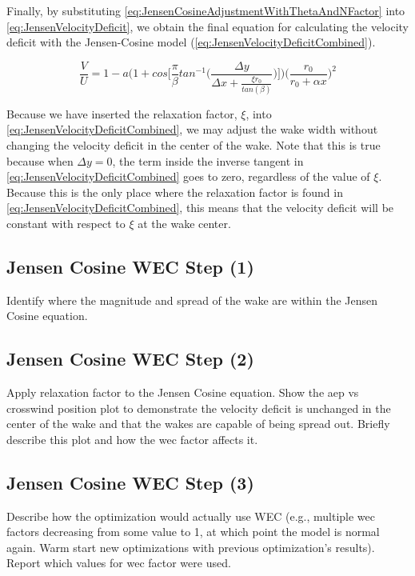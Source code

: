 \documentclass[a4paper]{jpconf}
\begin{document}
Finally, by substituting \cref{eq:JensenCosineAdjustmentWithThetaAndNFactor} into \cref{eq:JensenVelocityDeficit}, we obtain the final equation for calculating the velocity deficit with the Jensen-Cosine model (\cref{eq:JensenVelocityDeficitCombined}).

\begin{equation}
    \frac{V}{U} = 1 - a \Bigg(1 + cos\Bigg[\frac{\pi}{\beta} tan^{-1}\Bigg(\frac{\Delta y}{\Delta x + \frac{\xi r_0}{tan(\beta)}} \Bigg) \Bigg] \Bigg) \bigg(\frac{r_0}{r_0 + \alpha x} \bigg)^2
    \label{eq:JensenVelocityDeficitCombined}
\end{equation}

Because we have inserted the relaxation factor, $\xi$, into \cref{eq:JensenVelocityDeficitCombined}, we may adjust the wake width without changing the velocity deficit in the center of the wake. Note that this is true because when $\Delta y = 0$, the term inside the inverse tangent in \cref{eq:JensenVelocityDeficitCombined} goes to zero, regardless of the value of $\xi$. Because this is the only place where the relaxation factor is found in \cref{eq:JensenVelocityDeficitCombined}, this means that the velocity deficit will be constant with respect to $\xi$ at the wake center.

\subsection{Jensen Cosine WEC Step (1)}
Identify where the magnitude and spread of the wake are within the Jensen Cosine equation.

\subsection{Jensen Cosine WEC Step (2)}
Apply relaxation factor to the Jensen Cosine equation. Show the aep vs crosswind position plot to demonstrate the velocity deficit is unchanged in the center of the wake and that the wakes are capable of being spread out. Briefly describe this plot and how the wec factor affects it.

\subsection{Jensen Cosine WEC Step (3)}
Describe how the optimization would actually use WEC (e.g., multiple wec factors decreasing from some value to 1, at which point the model is normal again. Warm start new optimizations with previous optimization's results). Report which values for wec factor were used.
\end{document}
